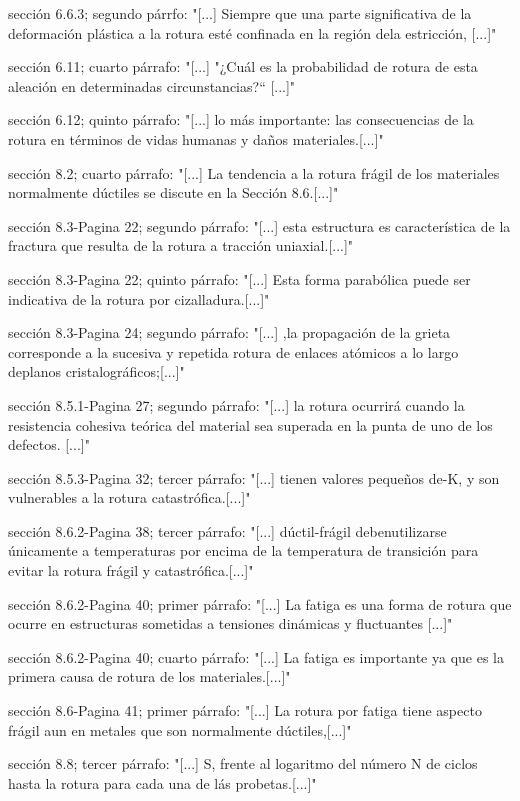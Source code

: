 \documentclass[12pt,a4paper]{article}
\begin{document}
sección 6.6.3; segundo párrfo: "[...] Siempre que una parte significativa de la deformación plástica a la rotura esté confinada en la región dela estricción, [...]"
    
sección 6.11; cuarto párrafo: "[...] "¿Cuál es la probabilidad de rotura de esta aleación en determinadas circunstancias?“ [...]"
    
sección 6.12; quinto párrafo: "[...] lo más importante: las consecuencias de la rotura en términos de vidas humanas y daños materiales.[...]"

sección 8.2; cuarto párrafo: "[...] La tendencia a la rotura frágil de los materiales normalmente dúctiles se discute en la Sección 8.6.[...]"

sección 8.3-Pagina 22; segundo párrafo: "[...] esta estructura es característica de la fractura que resulta de la rotura a tracción uniaxial.[...]"

sección 8.3-Pagina 22; quinto párrafo: "[...] Esta forma parabólica puede ser indicativa de la rotura por cizalladura.[...]"

sección 8.3-Pagina 24; segundo párrafo: "[...] ,la propagación de la grieta corresponde a la sucesiva y repetida rotura de enlaces atómicos a lo largo deplanos cristalográficos;[...]"

sección 8.5.1-Pagina 27; segundo párrafo: "[...] la rotura ocurrirá cuando la resistencia cohesiva teórica del material sea superada en la punta de uno de los defectos. [...]"
 
sección 8.5.3-Pagina 32; tercer párrafo: "[...] tienen valores pequeños de-K, y son vulnerables a la rotura catastrófica.[...]"

sección 8.6.2-Pagina 38; tercer párrafo: "[...] dúctil-frágil debenutilizarse únicamente a temperaturas por encima de la temperatura de transición para evitar la rotura frágil y catastrófica.[...]"

sección 8.6.2-Pagina 40; primer párrafo: "[...] La fatiga es una forma de rotura que ocurre en estructuras sometidas a tensiones dinámicas y fluctuantes [...]" 

sección 8.6.2-Pagina 40; cuarto párrafo: "[...] La fatiga es importante ya que es la primera causa de rotura de los materiales.[...]"

sección 8.6-Pagina 41; primer párrafo: "[...] La rotura por fatiga tiene aspecto frágil aun en metales que son normalmente dúctiles,[...]"

sección 8.8; tercer párrafo: "[...] S, frente al logaritmo del número N de ciclos hasta la rotura para cada una de lás probetas.[...]"
\end{document}
